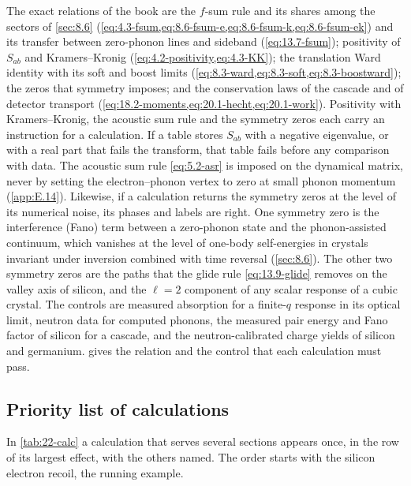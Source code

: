 The exact relations of the book are the $f$-sum rule and its shares among the sectors of \cref{sec:8.6} (\cref{eq:4.3-fsum,eq:8.6-fsum-e,eq:8.6-fsum-k,eq:8.6-fsum-ek}) and its transfer between zero-phonon lines and sideband (\cref{eq:13.7-fsum}); positivity of $S_{ab}$ and Kramers--Kronig (\cref{eq:4.2-positivity,eq:4.3-KK}); the translation Ward identity with its soft and boost limits (\cref{eq:8.3-ward,eq:8.3-soft,eq:8.3-boostward}); the zeros that symmetry imposes; and the conservation laws of the cascade and of detector transport (\cref{eq:18.2-moments,eq:20.1-hecht,eq:20.1-work}). Positivity with Kramers--Kronig, the acoustic sum rule and the symmetry zeros each carry an instruction for a calculation. If a table stores $S_{ab}$ with a negative eigenvalue, or with a real part that fails the transform, that table fails before any comparison with data. The acoustic sum rule \cref{eq:5.2-asr} is imposed on the dynamical matrix, never by setting the electron--phonon vertex to zero at small phonon momentum (\cref{app:E.14}). Likewise, if a calculation returns the symmetry zeros at the level of its numerical noise, its phases and labels are right. One symmetry zero is the interference (Fano) term between a zero-phonon state and the phonon-assisted continuum, which vanishes at the level of one-body self-energies in crystals invariant under inversion combined with time reversal (\cref{sec:8.6}). The other two symmetry zeros are the paths that the glide rule \cref{eq:13.9-glide} removes on the valley axis of silicon, and the $\ell = 2$ component of any scalar response of a cubic crystal. The controls are measured absorption for a finite-$q$ response in its optical limit, neutron data for computed phonons, the measured pair energy and Fano factor of silicon for a cascade, and the neutron-calibrated charge yields of silicon and germanium.  gives the relation and the control that each calculation must pass.

\subsection{Priority list of calculations}\label{sec:22.1-list}

In \cref{tab:22-calc} a calculation that serves several sections appears once, in the row of its largest effect, with the others named. The order starts with the silicon electron recoil, the running example.


